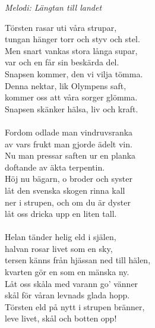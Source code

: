 {\footnotesize\textit{Melodi: Längtan till landet}}\par
\vspace{10pt}
Törsten rasar uti våra strupar,\\
tungan hänger torr och styv och stel.\\
Men snart vankas stora långa supar,\\
var och en får sin beskärda del.\\
Snapsen kommer, den vi vilja tömma.\\
Denna nektar, lik Olympens saft,\\
kommer oss att våra sorger glömma.\\
Snapsen skänker hälsa, liv och kraft.\\
\\
Fordom odlade man vindruvsranka\\
av vars frukt man gjorde ädelt vin.\\
Nu man pressar saften ur en planka\\
doftande av äkta terpentin.\\
Höj nu bägarn, o broder och syster\\
låt den svenska skogen rinna kall\\
ner i strupen, och om du är dyster\\
låt oss dricka upp en liten tall.\\
\\
Helan tänder helig eld i själen,\\
halvan rosar livet som en sky,\\
tersen känns från hjässan ned till hälen,\\
kvarten gör en som en mänska ny.\\
Låt oss skåla med varann go' vänner\\
skål för våran levnads glada hopp.\\
Törsten eld på nytt i strupen bränner,\\
leve livet, skål och botten opp!
